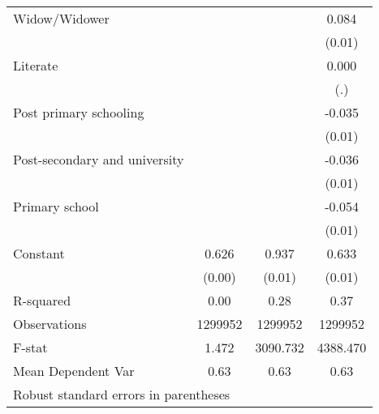 {\begin{tabular}{l*{3}{c}}
Widow/Widower       &                     &                     &       0.084\sym{***}\\
                    &                     &                     &      (0.01)         \\
Literate            &                     &                     &       0.000         \\
                    &                     &                     &         (.)         \\
Post primary schooling&                     &                     &      -0.035\sym{***}\\
                    &                     &                     &      (0.01)         \\
Post-secondary and university&                     &                     &      -0.036\sym{***}\\
                    &                     &                     &      (0.01)         \\
Primary school      &                     &                     &      -0.054\sym{***}\\
                    &                     &                     &      (0.01)         \\
Constant            &       0.626\sym{***}&       0.937\sym{***}&       0.633\sym{***}\\
                    &      (0.00)         &      (0.01)         &      (0.01)         \\
\hline
R-squared           &        0.00         &        0.28         &        0.37         \\
Observations        &     1299952         &     1299952         &     1299952         \\
F-stat              &       1.472         &    3090.732         &    4388.470         \\
Mean Dependent Var  &        0.63         &        0.63         &        0.63         \\
\hline\hline
\multicolumn{4}{l}{\footnotesize Robust standard errors in parentheses}\\
\end{tabular}
}
